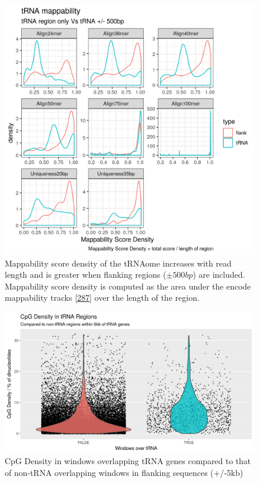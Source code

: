 \documentclass[
]{book}
\begin{document}
\begin{figure}

{\centering \includegraphics[width=1\linewidth]{./figs/mappabilityScoreDensity_tRNAVsFlank500} 

}

\caption{Mappability score density of the tRNAome increases with read length and is greater when flanking regions (\(\pm500bp\)) are included. Mappability score density is computed as the area under the encode mappability tracks {[}\protect\hyperlink{ref-Derrien2012}{287}{]} over the length of the region.}\label{fig:mappabilityScoreDensity}
\end{figure}



\begin{figure}

{\centering \includegraphics[width=1\linewidth]{figs/CpGcountBGvstRNAPlot} 

}

\caption{CpG Density in windows overlapping tRNA genes compared to that of non-tRNA overlapping windows in flanking sequences (+/-5kb)}\label{fig:CpGcountBGvstRNAPlot}
\end{figure}
\end{document}
